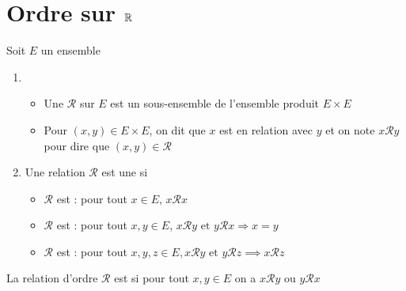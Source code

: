 \section*{Ordre sur $\mathbb{R}$}

\begin{frame}
Soit $E$ un ensemble


\begin{mydefinition}

\begin{enumerate}
\item 
\begin{itemize}
 \item Une  $\mathcal R$ sur $E$ est un sous-ensemble 
de l'ensemble produit $E\times E$
\pause
 \item Pour $(x,y)\in E\times E$, 
on dit que $x$ est en relation avec $y$ et on note $x\mathcal R y$ pour dire que $(x,y)\in\mathcal R$
\end{itemize}
\pause
\item Une relation $\mathcal R$ est une  si
\begin{itemize}
  \item $\mathcal R$ est  : pour tout $x\in E$, $x\mathcal R x$
  \item $\mathcal R$ est \!:\! pour tout $x,y \in E$, $ x\mathcal R y \text{ et } y\mathcal R x \Rightarrow  x=y$
  \item $\mathcal R$ est  : pour tout $x,y,z\in E, x\mathcal R y \text{ et } y\mathcal R z \implies x\mathcal R z$
\end{itemize}
\end{enumerate}
\end{mydefinition}\pause


\begin{mydefinition}
La relation d'ordre $\mathcal R$ est  si pour tout $x,y\in E$ on a $ x\mathcal R y \text{ ou } y\mathcal R x$
\end{mydefinition}
\end{frame}

